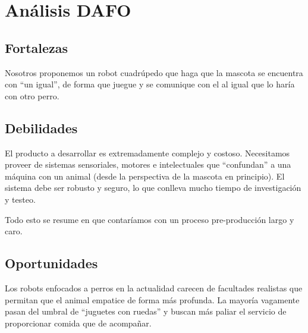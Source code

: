 \section{Análisis DAFO}  

\subsection{Fortalezas}

Nosotros proponemos un robot cuadrúpedo que haga que la mascota se encuentra con ``un igual'', de forma que juegue y se comunique con el al igual que lo haría con otro perro.


\subsection{Debilidades}

El producto a desarrollar es extremadamente complejo y costoso. Necesitamos proveer de sistemas sensoriales, motores e intelectuales que ``confundan'' a una máquina con un animal (desde la perspectiva de la mascota en principio). El sistema debe ser robusto y seguro, lo que conlleva mucho tiempo de investigación y testeo.

Todo esto se resume en que contaríamos con un proceso pre-producción largo y caro.

\subsection{Oportunidades}

Los robots enfocados a perros en la actualidad carecen de facultades realistas que permitan que el animal empatice de forma más profunda. La mayoría vagamente pasan del umbral de ``juguetes con ruedas'' y buscan más paliar el servicio de proporcionar comida que de acompañar.

